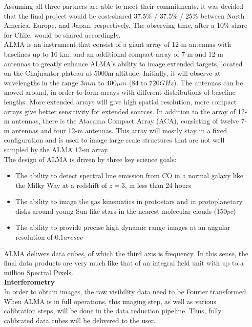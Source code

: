 Assuming all three partners are able to meet their commitments, it was decided that the final project would be cost-shared 37.5\% / 37.5\% / 25\% between North America, Europe, and Japan, respectively. The observing time, after a 10\% share for Chile, would be shared accordingly.\\

ALMA is an instrument that consist of a giant array of 12-m antennas with baselines up to 16 km, and an additional compact array of 7-m and 12-m antennas to greatly enhance ALMA's ability to image extended targets, located on the Chajnantor plateau at 5000m altitude. Initially, it will observe at wavelengths in the range $3 mm$ to $400 μm$ ($84$ to $720 GHz$). The antennas can be moved around, in order to form arrays with different distributions of baseline lengths. More extended arrays will give high spatial resolution, more compact arrays give better sensitivity for extended sources. In addition to the array of 12-m antennas, there is the Atacama Compact Array (ACA), consisting of twelve 7-m antennas and four 12-m antennas. This array will mostly stay in a fixed configuration and is used to image large scale structures that are not well sampled by the ALMA 12-m array.\\

The design of ALMA is driven by three key science goals:

\begin{itemize}

\item The ability to detect spectral line emission from CO in a normal galaxy like the Milky Way at a redshift of $z=3$, in less than 24 hours

\item The ability to image the gas kinematics in protostars and in protoplanetary disks around young Sun-like stars in the nearest molecular clouds ($150 pc$)

\item The ability to provide precise high dynamic range images at an angular resolution of $0.1 arcsec$
\end{itemize}
 
ALMA delivers data cubes, of which the third axis is frequency. In this sense, the final data products are very much like that of an integral field unit with up to a million Spectral Pixels.\\

\textbf{Interferometry}\\
In order to obtain images, the raw visibility data need to be Fourier transformed. When ALMA is in full operations, this imaging step, as well as various calibration steps, will be done in the data reduction pipeline. Thus, fully calibrated data cubes will be delivered to the user.\\

